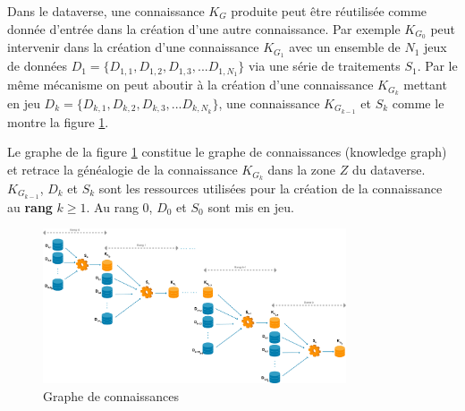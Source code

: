 Dans le dataverse, une connaissance $K_G$ produite peut être réutilisée comme donnée d'entrée dans la création d'une autre connaissance. Par exemple ${K_{G_0}}$ peut intervenir dans la création d'une connaissance ${K_{G_1}}$ avec un ensemble de $N_1$ jeux de données $D_1 = \{D_{1,1}, D_{1,2}, D_{1,3}, ... D_{1,N_1}\}$ via une série de traitements $S_1$. Par le même mécanisme on peut aboutir à la création d'une connaissance ${K_{G_k}}$ mettant en jeu $D_k = \{D_{k,1}, D_{k,2}, D_{k,3}, ... D_{k,N_k}\}$, une connaissance ${K_{G_{k-1}}}$ et $S_k$ comme le montre la figure \ref{fig:kg_graph}.

Le graphe de la figure \ref{fig:kg_graph} constitue le graphe de connaissances (knowledge graph) et retrace la généalogie de la connaissance ${K_{G_k}}$ dans la zone $Z$ du dataverse. ${K_{G_{k-1}}}$, $D_k$ et $S_k$ sont les ressources utilisées pour la création de la connaissance au \textbf{rang} $k \geq 1$. Au rang 0, $D_0$ et $S_0$ sont mis en jeu.

\begin{figure}[H]
    \centering
    \includegraphics[width=0.8\textwidth]{ILLUSTRATIONS/kg_graph.png}
    \caption{Graphe de connaissances}
    \label{fig:kg_graph}
\end{figure}



